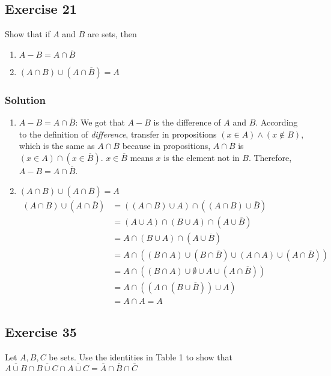 \documentclass{article}
\theoremstyle{mytheoremstyle}
\theoremstyle{mytheoremstyle}
\theoremstyle{myproblemstyle}
\begin{document}
    \subsection*{Exercise 21}
        Show that if \(A\) and \(B\) are sets, then
        \begin{enumerate} [label = (\alph*)]
            \item \(A - B = A \cap \overline{B}\)
            \item \((A \cap B) \cup (A \cap \overline{B}) = A\)
        \end{enumerate}
    \subsubsection*{Solution}
        \begin{enumerate} [label = (\alph*)]
            \item \(A - B = A \cap \overline{B}\): We got that \(A - B\) is the difference of \(A\) and \(B\).
            According to the definition of \textit{difference}, transfer in propositions \((x \in A) \land (x \notin B)\), which is 
            the same as \(A \cap \overline{B}\) because in propositions, \(A \cap \overline{B}\) is \((x \in A) \cap (x \in \overline{B})\).
            \(x \in \overline{B}\) means \(x\) is the element not in \(B\). Therefore, \(A - B = A \cap \overline{B}\).
            \item \((A \cap B) \cup (A \cap \overline{B}) = A\) 
            \begin{align*}
                (A \cap B) \cup (A \cap \overline{B}) &= ((A \cap B) \cup A) \cap ((A \cap B) \cup \overline{B})\\
                &= (A \cup A) \cap (B \cup A) \cap (A \cup \overline{B})\\
                &= A \cap (B \cup A) \cap (A \cup \overline{B})\\
                &= A \cap ((B \cap A) \cup (B \cap \overline{B}) \cup (A \cap A) \cup (A \cap \overline{B}))\\
                &= A \cap ((B \cap A) \cup \emptyset \cup A \cup (A \cap \overline{B}))\\
                &= A \cap ((A \cap (B \cup \overline{B})) \cup A)\\
                &= A \cap A = A 
            \end{align*}
        \end{enumerate}
    \subsection*{Exercise 35}
        Let \(A, B, C\) be sets. Use the identities in Table 1 to show that \(\overline{A \cup B} \cap \overline{B \cup C} \cap \overline{A \cup C} = \overline{A} \cap \overline{B} \cap \overline{C}\)
\end{document}
